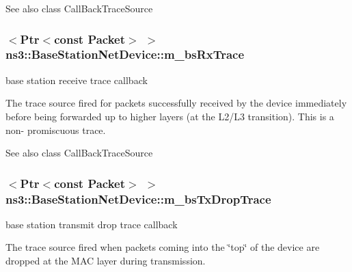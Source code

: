 \begin{DoxySeeAlso}{See also}
class Call\+Back\+Trace\+Source 
\end{DoxySeeAlso}
\subsubsection[{\texorpdfstring{m\+\_\+bs\+Rx\+Trace}{m_bsRxTrace}}]{$<${\bf Ptr}$<$const {\bf Packet}$>$ $>$ ns3\+::\+Base\+Station\+Net\+Device\+::m\+\_\+bs\+Rx\+Trace\hspace{0.3cm}{\ttfamily [private]}}\hypertarget{classns3_1_1BaseStationNetDevice_aff889426b2009f26312b689ac4015a8d}{}\label{classns3_1_1BaseStationNetDevice_aff889426b2009f26312b689ac4015a8d}


base station receive trace callback 

The trace source fired for packets successfully received by the device immediately before being forwarded up to higher layers (at the L2/\+L3 transition). This is a non-\/ promiscuous trace.

\begin{DoxySeeAlso}{See also}
class Call\+Back\+Trace\+Source 
\end{DoxySeeAlso}
\subsubsection[{\texorpdfstring{m\+\_\+bs\+Tx\+Drop\+Trace}{m_bsTxDropTrace}}]{$<${\bf Ptr}$<$const {\bf Packet}$>$ $>$ ns3\+::\+Base\+Station\+Net\+Device\+::m\+\_\+bs\+Tx\+Drop\+Trace\hspace{0.3cm}{\ttfamily [private]}}\hypertarget{classns3_1_1BaseStationNetDevice_a476cd66e863b2439f5a007a02805a7dc}{}\label{classns3_1_1BaseStationNetDevice_a476cd66e863b2439f5a007a02805a7dc}


base station transmit drop trace callback 

The trace source fired when packets coming into the \char`\"{}top\char`\"{} of the device are dropped at the M\+AC layer during transmission.

